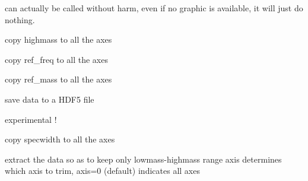 \documentclass[letterpaper,10pt,openany,oneside]{sphinxmanual}
\begin{document}
\begin{fulllineitems}
\begin{fulllineitems}
can actually be called without harm, even if no graphic is available, it will just do nothing.

\end{fulllineitems}


\begin{fulllineitems}
\label{rst/code:FTICR.FTICRData.highmass}
copy highmass to all the axes

\end{fulllineitems}


\begin{fulllineitems}
\label{rst/code:FTICR.FTICRData.ref_freq}
copy ref\_freq to all the axes

\end{fulllineitems}


\begin{fulllineitems}
\label{rst/code:FTICR.FTICRData.ref_mass}
copy ref\_mass to all the axes

\end{fulllineitems}


\begin{fulllineitems}
\label{rst/code:FTICR.FTICRData.save_msh5}
save data to a HDF5 file

experimental !

\end{fulllineitems}


\begin{fulllineitems}
\label{rst/code:FTICR.FTICRData.specwidth}
copy specwidth to all the axes

\end{fulllineitems}


\begin{fulllineitems}
\label{rst/code:FTICR.FTICRData.trimz}
extract the data so as to keep only lowmass-highmass range
axis determines which axis to trim, axis=0 (default) indicates all axes


\end{fulllineitems}
\end{fulllineitems}
\end{document}
